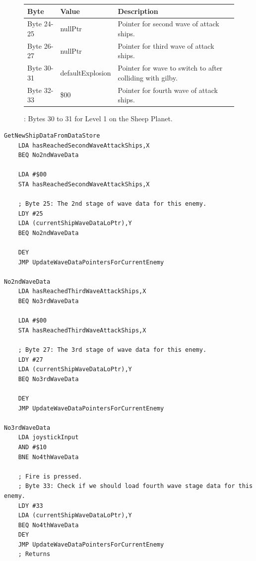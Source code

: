 \begin{figure}[H]

  {
    \setlength{\tabcolsep}{3.0pt}
    \setlength\cmidrulewidth{\heavyrulewidth} %
    \begin{adjustbox}{width=13cm}

      \begin{tabular}{lll}
        \toprule
        Byte    & Value                     & Description                                                        \\
        \midrule
 Byte 24-25 & nullPtr                   & Pointer for second wave of attack ships.                            \\
 Byte 26-27 & nullPtr                   & Pointer for third wave of attack ships.                             \\
 Byte 30-31 & defaultExplosion          & Pointer for  wave to switch to after colliding with gilby.          \\
 Byte 32-33 & \$00                       & Pointer for fourth wave of attack ships.                            \\
        \bottomrule
      \end{tabular}
    \end{adjustbox}
  }\caption{: Bytes 30 to 31 for Level 1 on the Sheep Planet.}
\end{figure}

\begin{lstlisting}
GetNewShipDataFromDataStore
    LDA hasReachedSecondWaveAttackShips,X
    BEQ No2ndWaveData

    LDA #$00
    STA hasReachedSecondWaveAttackShips,X

    ; Byte 25: The 2nd stage of wave data for this enemy.
    LDY #25
    LDA (currentShipWaveDataLoPtr),Y
    BEQ No2ndWaveData

    DEY
    JMP UpdateWaveDataPointersForCurrentEnemy

No2ndWaveData   
    LDA hasReachedThirdWaveAttackShips,X
    BEQ No3rdWaveData

    LDA #$00
    STA hasReachedThirdWaveAttackShips,X

    ; Byte 27: The 3rd stage of wave data for this enemy.
    LDY #27
    LDA (currentShipWaveDataLoPtr),Y
    BEQ No3rdWaveData

    DEY
    JMP UpdateWaveDataPointersForCurrentEnemy

No3rdWaveData   
    LDA joystickInput
    AND #$10
    BNE No4thWaveData

    ; Fire is pressed.
    ; Byte 33: Check if we should load fourth wave stage data for this enemy.
    LDY #33
    LDA (currentShipWaveDataLoPtr),Y
    BEQ No4thWaveData
    DEY
    JMP UpdateWaveDataPointersForCurrentEnemy
    ; Returns
\end{lstlisting}

